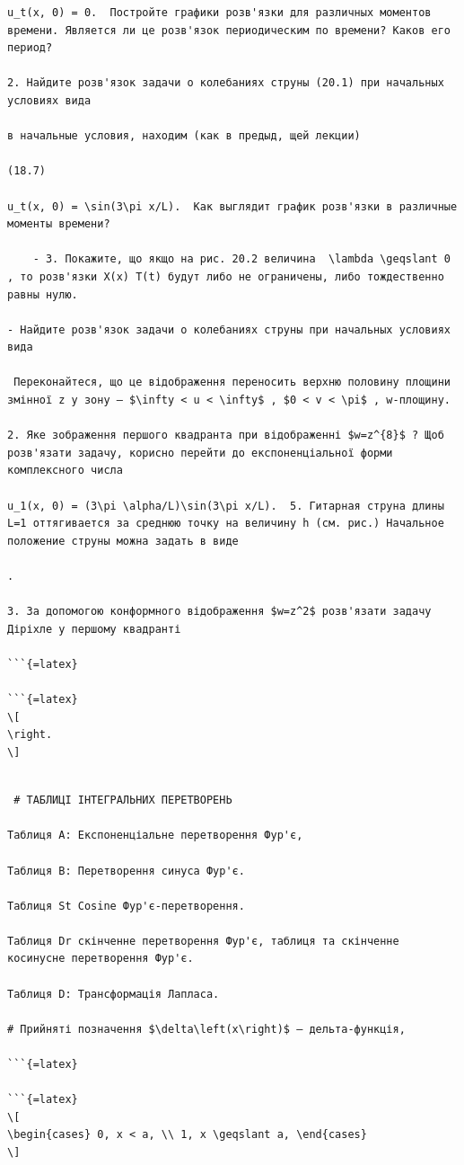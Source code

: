 \documentclass[
  ukrainian,
]{article}
\begin{document}
\begin{verbatim}
u_t(x, 0) = 0.  Постройте графики розв'язки для различных моментов времени. Является ли це розв'язок периодическим по времени? Каков его период?

2. Найдите розв'язок задачи о колебаниях струны (20.1) при начальных условиях вида

в начальные условия, находим (как в предыд, щей лекции)

(18.7)

u_t(x, 0) = \sin(3\pi x/L).  Как выглядит график розв'язки в различные моменты времени?

    - 3. Покажите, що якщо на рис. 20.2 величина  \lambda \geqslant 0  , то розв'язки X(x) T(t) будут либо не ограничены, либо тождественно равны нулю.

- Найдите розв'язок задачи о колебаниях струны при начальных условиях вида

 Переконайтеся, що це відображення переносить верхню половину площини змінної z у зону — $\infty < u < \infty$ , $0 < v < \pi$ , w-площину.

2. Яке зображення першого квадранта при відображенні $w=z^{8}$ ? Щоб розв'язати задачу, корисно перейти до експоненціальної форми комплексного числа

u_1(x, 0) = (3\pi \alpha/L)\sin(3\pi x/L).  5. Гитарная струна длины L=1 оттягивается за среднюю точку на величину h (см. рис.) Начальное положение струны можна задать в виде

.

3. За допомогою конформного відображення $w=z^2$ розв'язати задачу Діріхле у першому квадранті

```{=latex}

```{=latex}
\[
\right.
\]
\end{verbatim}

\begin{verbatim}

 # ТАБЛИЦІ ІНТЕГРАЛЬНИХ ПЕРЕТВОРЕНЬ

Таблиця A: Експоненціальне перетворення Фур'є,

Таблиця B: Перетворення синуса Фур'є.

Таблиця St Cosine Фур'є-перетворення.

Таблиця Dr скінченне перетворення Фур'є, таблиця та скінченне косинусне перетворення Фур'є.

Таблиця D: Трансформація Лапласа.

# Прийняті позначення $\delta\left(x\right)$ — дельта-функція,

```{=latex}

```{=latex}
\[
\begin{cases} 0, x < a, \\ 1, x \geqslant a, \end{cases}
\]
\end{verbatim}
\end{document}
